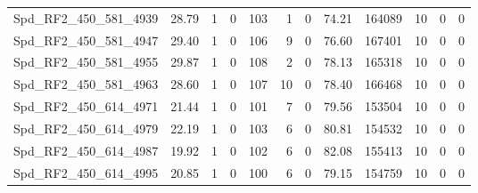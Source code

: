 \begin{longtable}[c]{@{}lrrrrrrrrrrr@{}}
Spd\_RF2\_450\_581\_4939      & 28.79                  & 1                       & 0                       & 103                    & 1                       & 0                       & 74.21                   & 164089                   & 10                       & 0                        & 0                        \\
Spd\_RF2\_450\_581\_4947      & 29.40                  & 1                       & 0                       & 106                    & 9                       & 0                       & 76.60                   & 167401                   & 10                       & 0                        & 0                        \\
Spd\_RF2\_450\_581\_4955      & 29.87                  & 1                       & 0                       & 108                    & 2                       & 0                       & 78.13                   & 165318                   & 10                       & 0                        & 0                        \\
Spd\_RF2\_450\_581\_4963      & 28.60                  & 1                       & 0                       & 107                    & 10                      & 0                       & 78.40                   & 166468                   & 10                       & 0                        & 0                        \\
Spd\_RF2\_450\_614\_4971      & 21.44                  & 1                       & 0                       & 101                    & 7                       & 0                       & 79.56                   & 153504                   & 10                       & 0                        & 0                        \\
Spd\_RF2\_450\_614\_4979      & 22.19                  & 1                       & 0                       & 103                    & 6                       & 0                       & 80.81                   & 154532                   & 10                       & 0                        & 0                        \\
Spd\_RF2\_450\_614\_4987      & 19.92                  & 1                       & 0                       & 102                    & 6                       & 0                       & 82.08                   & 155413                   & 10                       & 0                        & 0                        \\
Spd\_RF2\_450\_614\_4995      & 20.85                  & 1                       & 0                       & 100                    & 6                       & 0                       & 79.15                   & 154759                   & 10                       & 0                        & 0                        \\

\end{longtable}
